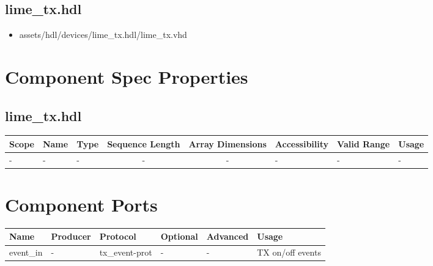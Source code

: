 \documentclass{article}
\def\comp{lime\_tx}
\begin{document}
\subsection*{\comp.hdl}
\begin{itemize}
  \item assets/hdl/devices/\comp{}.hdl/\comp{}.vhd
\end{itemize}
\begin{landscape}

  \section*{Component Spec Properties}
  \begin{scriptsize}
  \subsection*{\comp.hdl}
      \begin{tabular}{|p{2cm}|p{2cm}|p{1cm}|c|c|p{1.75cm}|p{1.5cm}|p{7cm}|}
      \hline
      \rowcolor{blue}
      Scope    & Name  				& Type  & Sequence Length 	& Array Dimensions 	& Accessibility & Valid Range 	& Usage \\
      \hline
      - & - & - & - & - & - & - & - \\
      \hline
  \end{tabular}
  \end{scriptsize}

  \section*{Component Ports}
  \begin{scriptsize}
    \begin{tabular}{|p{2cm}|p{1.5cm}|p{4cm}|p{1.5cm}|p{1.5cm}|p{10cm}|}
      \hline
      \rowcolor{blue}
      Name 		& Producer & Protocol           & Optional & Advanced & Usage      		\\
      \hline
      event\_in & -        & tx\_event-prot     & -        & -        & TX on/off events\\
      \hline
    \end{tabular}
  \end{scriptsize}


\end{landscape}
\end{document}
